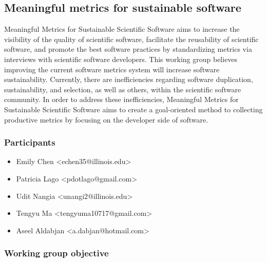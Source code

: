 \subsection{Meaningful metrics for sustainable software}
\label{sec:metrics}



Meaningful Metrics for Sustainable Scientific Software aims to increase the visibility of the quality of scientific software, facilitate the reusability of scientific software, and promote the best software practices by standardizing metrics via interviews with scientific software developers. This working group believes improving the current software metrics system will increase software sustainability. Currently, there are inefficiencies regarding software duplication, sustainability, and selection, as well as others, within the scientific software community. In order to address these inefficiencies, Meaningful Metrics for Sustainable Scientific Software aims to create a goal-oriented method to collecting productive metrics by focusing on the developer side of software.

\subsubsection{Participants}


\begin{itemize}
\item Emily Chen <echen35@illinois.edu>
\item Patricia Lago <pdotlago@gmail.com>
\item Udit Nangia <unangi2@illinois.edu>
\item Tengyu Ma <tengyuma10717@gmail.com>
\item Aseel Aldabjan <a.dabjan@hotmail.com>
\end{itemize}

\subsubsection{Working group objective}



